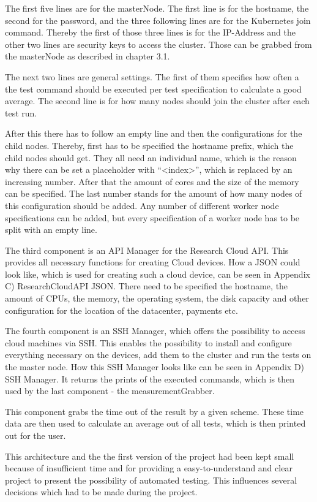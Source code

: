 The first five lines are for the masterNode. The first line is for the hostname, the second for the password, and the three following lines are for the Kubernetes join command. Thereby the first of those three lines is for the IP-Address and the other two lines are security keys to access the cluster. Those can be grabbed from the masterNode as described in chapter 3.1.

The next two lines are general settings. The first of them specifies how often a the test command should be executed per test specification to calculate a good average. The second line is for how many nodes should join the cluster after each test run.

After this there has to follow an empty line and then the configurations for the child nodes. Thereby, first has to be specified the hostname prefix, which the child nodes should get. They all need an individual name, which is the reason why there can be set a placeholder with ``<index>'', which is replaced by an increasing number. After that the amount of cores and the size of the memory can be specified. The last number stands for the amount of how many nodes of this configuration should be added. Any number of different worker node specifications can be added, but every specification of a worker node has to be split with an empty line.

The third component is an API Manager for the Research Cloud API. This provides all necessary functions for creating Cloud devices. How a JSON could look like, which is used for creating such a cloud device, can be seen in Appendix C) ResearchCloudAPI JSON. There need to be specified the hostname, the amount of CPUs, the memory, the operating system, the disk capacity and other configuration for the location of the datacenter, payments etc.

The fourth component is an SSH Manager, which offers the possibility to access cloud machines via SSH. This enables the possibility to install and configure everything necessary on the devices, add them to the cluster and run the tests on the master node. How this SSH Manager looks like can be seen in Appendix D) SSH Manager. It returns the prints of the executed commands, which is then used by the last component - the measurementGrabber.

This component grabs the time out of the result by a given scheme. These time data are then used to calculate an average out of all tests, which is then printed out for the user.

This architecture and the the first version of the project had been kept small because of insufficient time and for providing a easy-to-understand and clear project to present the possibility of automated testing. This influences several decisions which had to be made during the project.

